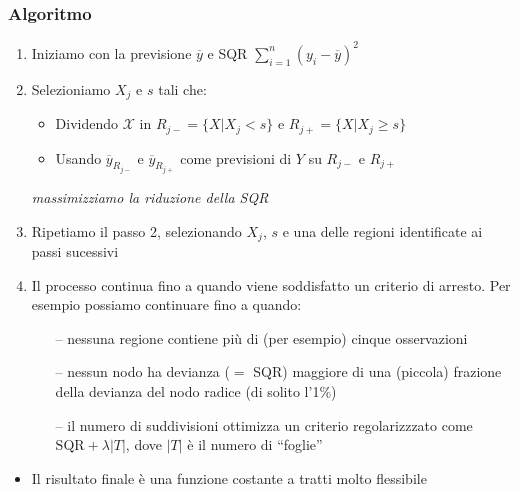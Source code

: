 {\begin{frame}
	\frametitle{Algoritmo}
	
	\begin{enumerate}
		\item Iniziamo con la previsione $\overline y$ e SQR $\sum_{i=1}^n (y_i-\overline y)^2$
		\item Selezioniamo $X_j$ e $s$ tali che:
			\begin{itemize}
				\item Dividendo $\mathcal{X}$ in $R_{j-} = \{X|X_j < s\}$ e $R_{j+} = \{X|X_j \geq s\}$
				\item Usando $\overline y_{R_{j-}}$ e $\overline y_{R_{j+}}$ come previsioni di $Y$ su $R_{j-}$ e $R_{j+}$
			\end{itemize}
			\emph{massimizziamo la riduzione della SQR}
		\item Ripetiamo il passo 2, selezionando $X_j$, $s$  e una delle regioni identificate ai passi sucessivi
		\item Il processo continua fino a quando viene soddisfatto un criterio di arresto. Per esempio possiamo continuare fino a quando:
			\begin{itemize}
				\item[--] nessuna regione contiene più di (per esempio) cinque osservazioni
				\item[--] nessun nodo ha devianza ($=$ SQR) maggiore di una (piccola) frazione della devianza del nodo radice (di solito l'1\%)
				\item[--] il numero di suddivisioni ottimizza un criterio regolarizzzato come $\mbox{SQR}+\lambda |T|$, dove $|T|$ è il numero di ``foglie''
			\end{itemize}
	\end{enumerate}
	\begin{itemize}
		\item Il risultato finale è una funzione costante a tratti molto flessibile
	\end{itemize}
\end{frame}

}

